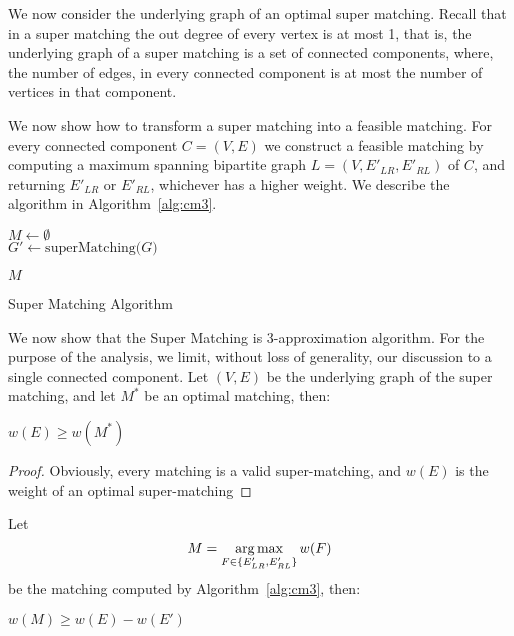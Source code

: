 We now consider the underlying graph of an optimal super matching.
Recall that in a super matching the out degree of every vertex is at most 1,
that is, the underlying graph of a super matching is a set of connected components,
where, the number of edges, 
in every connected component is at most the number of vertices in that component.

We now show how to transform a super matching into a feasible matching.
For every connected component $C = (V, E)$ we construct a feasible matching by
computing a maximum spanning bipartite graph $L = (V, E'_{LR}, E'_{RL})$ of $C$,
and returning $E'_{LR}$ or $E'_{RL}$,
whichever has a higher weight. 
We describe the algorithm in Algorithm~\ref{alg:cm3}.

\begin{algorithm}
\label{alg:cm3}

$M \leftarrow \emptyset$								\\
$G' \leftarrow \text{superMatching($G$)}$				\\


\Return $M$
\caption{Super Matching Algorithm}
\end{algorithm}

We now show that the Super Matching is 3-approximation algorithm.
For the purpose of the analysis, we limit, without loss of generality, 
our discussion to a single connected component.
Let $(V, E)$ be the underlying graph of the super matching, 
and let $M^*$ be an optimal matching, then:
\begin{lemma}
\label{lm:super-geq-m^*}
$w(E) \geq w(M^*)$
\end{lemma}

\begin{proof}
Obviously, every matching is a valid super-matching, 
and $w(E)$ is the weight of an optimal super-matching 
\end{proof}

Let
$$ M = \operatorname*{arg\,max}_{F \in \{ E'_{LR}, E'_{RL} \}}{w(F)} $$
be the matching computed by Algorithm~\ref{alg:cm3}, then:

\begin{lemma}
\label{lm:more_than_e}
$w(M) \geq w(E) - w(E')$
\end{lemma}


